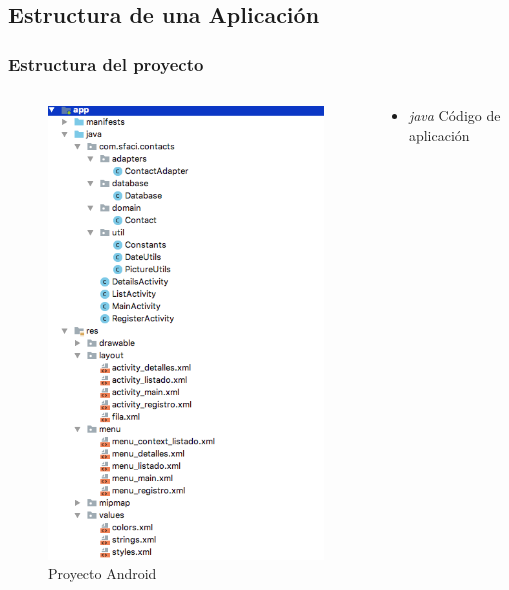\documentclass[xcolor={dvipsnames}]{beamer}
\begin{document}
\subsection{Estructura de una Aplicación}
\begin{frame}\frametitle{Estructura del proyecto}
    \begin{columns}
        \begin{column}{4cm}
        \begin{figure}
        \includegraphics[scale=0.2]{images/project_structure} 
        \caption{Proyecto Android}
        \end{figure}
        \end{column}
        \pause
        \begin{column}{6cm}
        \begin{block}{}
        \begin{itemize}
            \item \emph{\textcolor{resalta}{java}} Código de aplicación

\end{itemize}
\end{block}
\end{column}
\end{columns}
\end{frame}
\end{document}
